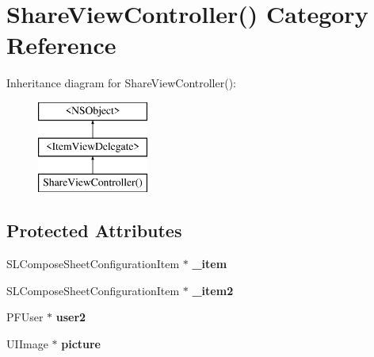 \hypertarget{category_share_view_controller_07_08}{}\section{Share\+View\+Controller() Category Reference}
\label{category_share_view_controller_07_08}
Inheritance diagram for Share\+View\+Controller()\+:\begin{figure}[H]
\begin{center}
\leavevmode
\includegraphics[height=3.000000cm]{category_share_view_controller_07_08}
\end{center}
\end{figure}
\subsection*{Protected Attributes}
\begin{DoxyCompactItemize}
\item 
\hypertarget{category_share_view_controller_07_08_a987c8d19a2aeaf955a6bc21b75c1470a}{}S\+L\+Compose\+Sheet\+Configuration\+Item $\ast$ {\bfseries \+\_\+item}\label{category_share_view_controller_07_08_a987c8d19a2aeaf955a6bc21b75c1470a}

\item 
\hypertarget{category_share_view_controller_07_08_af53e9304926fc818fda037df79621f05}{}S\+L\+Compose\+Sheet\+Configuration\+Item $\ast$ {\bfseries \+\_\+item2}\label{category_share_view_controller_07_08_af53e9304926fc818fda037df79621f05}

\item 
\hypertarget{category_share_view_controller_07_08_aee3a501e6d16552a6451d861aa35d153}{}P\+F\+User $\ast$ {\bfseries user2}\label{category_share_view_controller_07_08_aee3a501e6d16552a6451d861aa35d153}

\item 
\hypertarget{category_share_view_controller_07_08_a7b36c78bc0a17c09c46e1c2d8b97d09e}{}U\+I\+Image $\ast$ {\bfseries picture}\label{category_share_view_controller_07_08_a7b36c78bc0a17c09c46e1c2d8b97d09e}

\end{DoxyCompactItemize}
